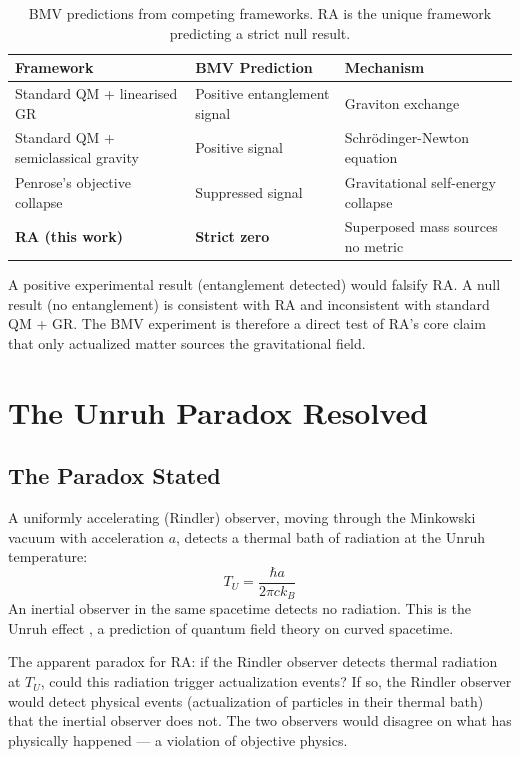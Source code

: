 \documentclass[12pt,a4paper]{article}
\begin{document}
\begin{table}[ht]
\centering
\caption{BMV predictions from competing frameworks.  RA is the unique framework predicting a strict null result.}
\label{tab:bmv_predictions}
\begin{tabular}{lll}
\toprule
Framework & BMV Prediction & Mechanism \\
\midrule
Standard QM + linearised GR & Positive entanglement signal & Graviton exchange \\
Standard QM + semiclassical gravity & Positive signal & Schr\"odinger-Newton equation \\
Penrose's objective collapse & Suppressed signal & Gravitational self-energy collapse \\
\textbf{RA (this work)} & \textbf{Strict zero} & Superposed mass sources no metric \\
\bottomrule
\end{tabular}
\end{table}

A positive experimental result (entanglement detected) would falsify RA.  A null result (no entanglement) is consistent with RA and inconsistent with standard QM + GR.  The BMV experiment is therefore a direct test of RA's core claim that only actualized matter sources the gravitational field.

\section{The Unruh Paradox Resolved}\label{sec:unruh}

\subsection{The Paradox Stated}

A uniformly accelerating (Rindler) observer, moving through the Minkowski vacuum with acceleration $a$, detects a thermal bath of radiation at the Unruh temperature:
\begin{equation}
  T_U = \frac{\hbar a}{2\pi ck_B}
  \label{eq:unruh_temp}
\end{equation}
An inertial observer in the same spacetime detects no radiation.  This is the Unruh effect \cite{Unruh1976}, a prediction of quantum field theory on curved spacetime.

The apparent paradox for RA: if the Rindler observer detects thermal radiation at $T_U$, could this radiation trigger actualization events?  If so, the Rindler observer would detect physical events (actualization of particles in their thermal bath) that the inertial observer does not.  The two observers would disagree on what has physically happened --- a violation of objective physics.
\end{document}
